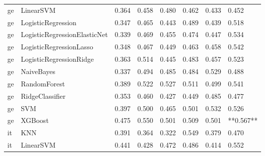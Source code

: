 \begin{tabular}{llllllll}
      ge &                    LinearSVM & 0.364 &                     0.458 &                 0.480 &                  0.462 &                                   0.433 &     0.452 \\
      ge &           LogisticRegression & 0.347 &                     0.465 &                 0.443 &                  0.489 &                                   0.439 &     0.518 \\
      ge & LogisticRegressionElasticNet & 0.339 &                     0.469 &                 0.455 &                  0.474 &                                   0.447 &     0.534 \\
      ge &      LogisticRegressionLasso & 0.348 &                     0.467 &                 0.449 &                  0.463 &                                   0.458 &     0.542 \\
      ge &      LogisticRegressionRidge & 0.363 &                     0.514 &                 0.445 &                  0.483 &                                   0.457 &     0.523 \\
      ge &                   NaiveBayes & 0.337 &                     0.494 &                 0.485 &                  0.484 &                                   0.529 &     0.488 \\
      ge &                 RandomForest & 0.389 &                     0.522 &                 0.527 &                  0.511 &                                   0.499 &     0.541 \\
      ge &              RidgeClassifier & 0.353 &                     0.460 &                 0.427 &                  0.449 &                                   0.485 &     0.477 \\
      ge &                          SVM & 0.397 &                     0.500 &                 0.465 &                  0.501 &                                   0.532 &     0.526 \\
      ge &                      XGBoost & 0.475 &                     0.550 &                 0.501 &                  0.509 &                                   0.501 & **0.567** \\
      it &                          KNN & 0.391 &                     0.364 &                 0.322 &                  0.549 &                                   0.379 &     0.470 \\
      it &                    LinearSVM & 0.441 &                     0.428 &                 0.472 &                  0.486 &                                   0.414 &     0.552 \\

\end{tabular}
